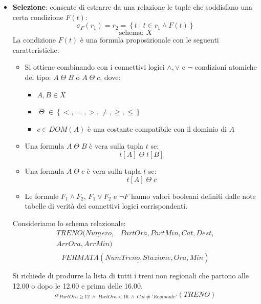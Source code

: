 \documentclass[a4paper,twoside]{article}
\begin{document}
\begin{itemize}
\begin{itemize}
      \item \textbf{Selezione}: consente di estrarre da una relazione le tuple che
        soddisfano una certa condizione \( F(t) \):
        \[
          \sigma_F(r_1) = r_2 = \left\{ t \mid t \in r_1 \land F(t) \right\}
        \] 
        \[
          \text{schema: } X
        \] 
        La condizione \( F(t) \) è una formula proposizionale con le seguenti
        caratteristiche:
        \begin{itemize}
          \item Si ottiene combinando con i connettivi logici \( \land, \lor  \) e \( \lnot \)
            condizioni atomiche del tipo: \( A \;\Theta\; B \) o \( A \;\Theta\; c \), dove:
            \begin{itemize}
              \item \( A, B \in X \)
              \item \( \;\Theta\; \in \left\{ <, =, >, \neq, \ge, \le  \right\} \)
              \item \( c \in DOM(A) \) è una costante compatibile con il dominio di \( A \)
            \end{itemize}

          \item Una formula \( A \;\Theta\; B \) è vera sulla tupla \( t \) se:
            \[
              t[A] \;\Theta\; t[B]
            \] 

          \item Una formula \( A \;\Theta\; c \) è vera sulla tupla \( t \) se:
            \[
              t[A] \;\Theta\; c
            \]

          \item Le formule \( F_1 \land F_2 \), \( F_1 \lor F_2 \) e \( \lnot F \) hanno
            valori booleani definiti dalle note tabelle di verità dei connettivi logici
            corrispondenti.
        \end{itemize}

        \begin{example}
          Consideriamo lo schema relazionale:
          \[
            \begin{aligned}
              TRENO(\underline{Numero},& PartOra, PartMin, Cat, Dest,\\ ArrOra, ArrMin)\\
            \end{aligned}
          \] 
          \[
            FERMATA(\underline{NumTreno, Stazione}, Ora, Min)
          \] 

          \vspace{1em}
          \noindent
          Si richiede di produrre la lista di tutti i treni non regionali che partono
          alle 12.00 o dopo le 12.00 e prima delle 16.00.
          \[
            \sigma_{PartOra \ge 12 \;\land\; PartOra < 16 \;\land\; Cat \neq 'Regionale'}(TRENO)
          \] 
        \end{example}


\end{itemize}
\end{itemize}
\end{document}
